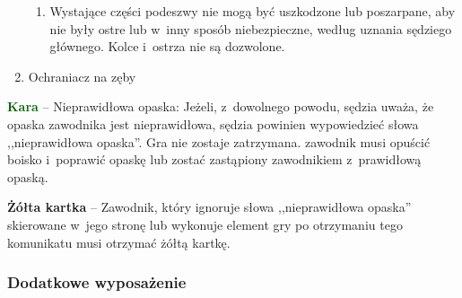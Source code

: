\documentclass[12pt,a4paper]{article}
\newcommand\yellowcard[1]{\bgroup\textcolor{darkyellow}{\textbf{#1}}}
\newcommand\other[1]{\bgroup\textcolor{darkgreen}{\textbf{#1}}}
\begin{document}
\begin{enumerate}
	      \begin{enumerate}
		      \item
		            Wystające części podeszwy nie mogą być uszkodzone lub poszarpane,
		            aby nie były ostre lub w~inny sposób niebezpieczne, według uznania
		            sędziego głównego. Kolce i~ostrza nie są dozwolone.
	      \end{enumerate}
	\item
	      Ochraniacz na zęby
\end{enumerate}

\other{Kara} -- Nieprawidłowa opaska: Jeżeli, z~dowolnego powodu, sędzia
uważa, że opaska zawodnika jest nieprawidłowa, sędzia powinien
wypowiedzieć słowa ,,nieprawidłowa opaska''. Gra nie zostaje zatrzymana.
zawodnik musi opuścić boisko i~poprawić opaskę lub zostać zastąpiony
zawodnikiem z~prawidłową opaską.

\yellowcard{Żółta kartka} -- Zawodnik, który ignoruje słowa ,,nieprawidłowa
opaska'' skierowane w~jego stronę lub wykonuje element gry po otrzymaniu
tego komunikatu musi otrzymać żółtą kartkę.

\subsubsection{Dodatkowe wyposażenie}
\end{document}
